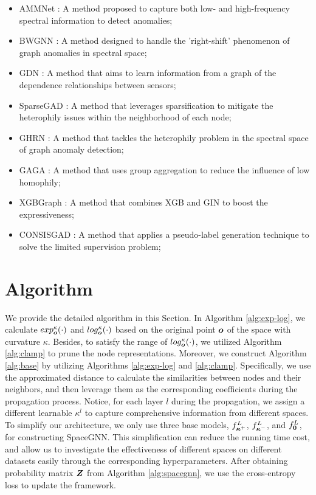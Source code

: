 \begin{itemize}[topsep=0.5mm, partopsep=0pt, itemsep=0pt, leftmargin=10pt]
    \item AMMNet \citep{amnet22chai}: A method proposed to capture both low- and high-frequency spectral information to detect anomalies;
    \item BWGNN \citep{bwgnn22tang}: A method designed to handle the 'right-shift' phenomenon of graph anomalies in spectral space;
    \item GDN \citep{gdn23gao}: A method that aims to learn information from a graph of the dependence relationships between sensors;
    \item SparseGAD \citep{sparsegad23gong}: A method that leverages sparsification to mitigate the heterophily issues within the neighborhood of each node;
    \item GHRN \citep{ghrn23gao}: A method that tackles the heterophily problem in the spectral space of graph anomaly detection;
    \item GAGA \citep{gaga23wang}: A method that uses group aggregation to reduce the influence of low homophily;
    \item XGBGraph \citep{gadbench23tang}: A method that combines XGB and GIN to boost the expressiveness;
    \item CONSISGAD \citep{consisgad24chen}: A method that applies a pseudo-label generation technique to solve the limited supervision problem;
\end{itemize}

\section{Algorithm}
\label{subsec:algorithm}




We provide the detailed algorithm in this Section. In Algorithm \ref{alg:exp-log}, we calculate $exp_{\boldsymbol{o}}^\kappa(\cdot)$ and $log_{\boldsymbol{o}}^\kappa(\cdot)$ based on the original point $\boldsymbol{o}$ of the space with curvature $\kappa$. Besides, to satisfy the range of $log_{\boldsymbol{o}}^\kappa(\cdot)$, we utilized Algorithm \ref{alg:clamp} to prune the node representations. Moreover, we construct Algorithm \ref{alg:base} by utilizing Algorithms \ref{alg:exp-log} and \ref{alg:clamp}. Specifically, we use the approximated distance to calculate the similarities between nodes and their neighbors, and then leverage them as the corresponding coefficients during the propagation process. Notice, for each layer $l$ during the propagation, we assign a different learnable $\kappa^l$ to capture comprehensive information from different spaces. To simplify our architecture, we only use three base models, $f_{\boldsymbol{\kappa}^+}^L$, $f_{\boldsymbol{\kappa}^-}^L$, and $f_{\boldsymbol{0}}^L$, for constructing SpaceGNN. This simplification can reduce the running time cost, and allow us to investigate the effectiveness of different spaces on different datasets easily through the corresponding hyperparameters. After obtaining probability matrix $\boldsymbol{Z}$ from Algorithm \ref{alg:spacegnn}, we use the cross-entropy loss to update the framework. 

